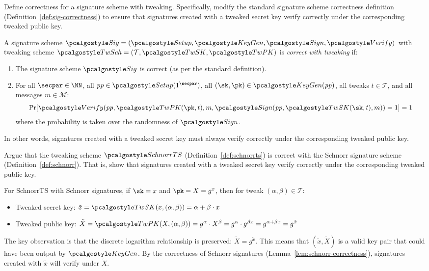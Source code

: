 \begin{exercise}
  Define correctness for a signature scheme with tweaking.
  Specifically, modify the standard signature scheme correctness definition (Definition~\ref{def:sig-correctness}) to ensure that signatures created with a tweaked secret key verify correctly under the corresponding tweaked public key.
\end{exercise}

\ifsolutions
\begin{mysolution}
  A signature scheme $\algo{Sig} = (\algo{Setup}, \algo{KeyGen}, \algo{Sign}, \algo{Verify})$ with tweaking scheme $\algo{TwSch} = (\mathcal{T}, \algo{TwSK}, \algo{TwPK})$ is \emph{correct with tweaking} if:
  \begin{enumerate}
    \item The signature scheme $\algo{Sig}$ is correct (as per the standard definition).
    \item For all $\secpar \in \NN$, all $\params \in \algo{Setup}(1^\secpar)$, all $(\sk, \pk) \in \algo{KeyGen}(\params)$, all tweaks $t \in \mathcal{T}$, and all messages $m \in \mathcal{M}$:
    \[
      \Pr[\algo{Verify}(\params, \algo{TwPK}(\pk, t), m, \algo{Sign}(\params, \algo{TwSK}(\sk, t), m)) = 1] = 1
    \]
    where the probability is taken over the randomness of $\algo{Sign}$.
  \end{enumerate}
  
  In other words, signatures created with a tweaked secret key must always verify correctly under the corresponding tweaked public key.
\end{mysolution}
\fi

\begin{exercise}[Optional]
  Argue that the tweaking scheme $\algo{SchnorrTS}$ (Definition~\ref{def:schnorrts}) is correct with the Schnorr signature scheme (Definition~\ref{def:schnorr}).
  That is, show that signatures created with a tweaked secret key verify correctly under the corresponding tweaked public key.
\end{exercise}

\ifsolutions
\begin{mysolution}
  For SchnorrTS with Schnorr signatures, if $\sk = x$ and $\pk = X = g^x$, then for tweak $(\alpha, \beta) \in \mathcal{T}$:
  \begin{itemize}
    \item Tweaked secret key: $\tilde{x} = \algo{TwSK}(x, (\alpha, \beta)) = \alpha + \beta \cdot x$
    \item Tweaked public key: $\tilde{X} = \algo{TwPK}(X, (\alpha, \beta)) = g^\alpha \cdot X^\beta = g^\alpha \cdot g^{\beta x} = g^{\alpha + \beta x} = g^{\tilde{x}}$
  \end{itemize}
  
  The key observation is that the discrete logarithm relationship is preserved: $\tilde{X} = g^{\tilde{x}}$.
  This means that $(\tilde{x}, \tilde{X})$ is a valid key pair that could have been output by $\algo{KeyGen}$.
  By the correctness of Schnorr signatures (Lemma~\ref{lem:schnorr-correctness}), signatures created with $\tilde{x}$ will verify under $\tilde{X}$.
\end{mysolution}
\fi

